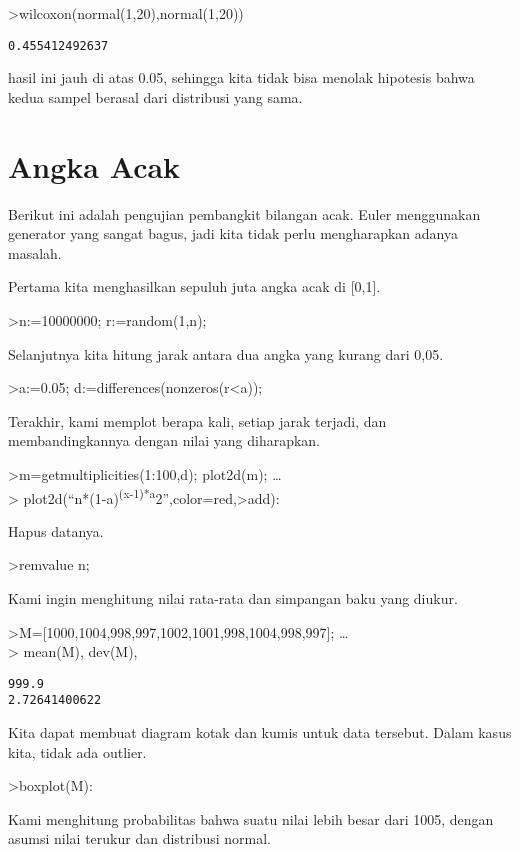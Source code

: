 \documentclass[
]{book}
\begin{document}
\textgreater wilcoxon(normal(1,20),normal(1,20))

\begin{verbatim}
0.455412492637
\end{verbatim}

hasil ini jauh di atas 0.05, sehingga kita tidak bisa menolak hipotesis bahwa kedua sampel berasal dari distribusi yang sama.

\chapter{Angka Acak}\label{angka-acak}

Berikut ini adalah pengujian pembangkit bilangan acak. Euler menggunakan generator yang sangat bagus, jadi kita tidak perlu mengharapkan adanya masalah.

Pertama kita menghasilkan sepuluh juta angka acak di {[}0,1{]}.

\textgreater n:=10000000; r:=random(1,n);

Selanjutnya kita hitung jarak antara dua angka yang kurang dari 0,05.

\textgreater a:=0.05; d:=differences(nonzeros(r\textless a));

Terakhir, kami memplot berapa kali, setiap jarak terjadi, dan membandingkannya dengan nilai yang diharapkan.

\textgreater m=getmultiplicities(1:100,d); plot2d(m); \ldots{}\\
\textgreater{} plot2d(``n*(1-a)\textsuperscript{(x-1)*a}2'',color=red,\textgreater add):

Hapus datanya.

\textgreater remvalue n;

Kami ingin menghitung nilai rata-rata dan simpangan baku yang diukur.

\textgreater M={[}1000,1004,998,997,1002,1001,998,1004,998,997{]}; \ldots{}\\
\textgreater{} mean(M), dev(M),

\begin{verbatim}
999.9
2.72641400622
\end{verbatim}

Kita dapat membuat diagram kotak dan kumis untuk data tersebut. Dalam kasus kita, tidak ada outlier.

\textgreater boxplot(M):

Kami menghitung probabilitas bahwa suatu nilai lebih besar dari 1005, dengan asumsi nilai terukur dan distribusi normal.
\end{document}
